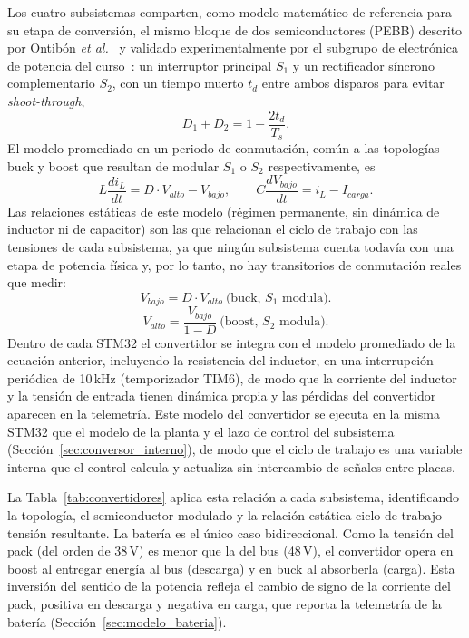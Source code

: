 \documentclass[conference]{IEEEtran}
\begin{document}
Los cuatro subsistemas comparten, como modelo matemático de referencia para su etapa de conversión, el mismo bloque de dos semiconductores (PEBB) descrito por Ontibón \emph{et al.}~\cite{ontibon2025pebb} y validado experimentalmente por el subgrupo de electrónica de potencia del curso~\cite{pinto2026peb}: un interruptor principal $S_1$ y un rectificador síncrono complementario $S_2$, con un tiempo muerto $t_d$ entre ambos disparos para evitar \emph{shoot-through},
\begin{equation}
D_1 + D_2 = 1 - \frac{2t_d}{T_s}.
\end{equation}
El modelo promediado en un periodo de conmutación, común a las topologías buck y boost que resultan de modular $S_1$ o $S_2$ respectivamente, es
\begin{equation}
L\frac{di_L}{dt} = D\cdot V_{alto} - V_{bajo}, \qquad C\frac{dV_{bajo}}{dt} = i_L - I_{carga}.
\end{equation}
Las relaciones estáticas de este modelo (régimen permanente, sin dinámica de inductor ni de capacitor) son las que relacionan el ciclo de trabajo con las tensiones de cada subsistema, ya que ningún subsistema cuenta todavía con una etapa de potencia física y, por lo tanto, no hay transitorios de conmutación reales que medir:
\begin{equation}
V_{bajo} = D\cdot V_{alto} \ \text{(buck, } S_1 \text{ modula)}.
\end{equation}
\begin{equation}
V_{alto} = \frac{V_{bajo}}{1-D} \ \text{(boost, } S_2 \text{ modula)}.
\end{equation}
Dentro de cada STM32 el convertidor se integra con el modelo promediado de la ecuación anterior, incluyendo la resistencia del inductor, en una interrupción periódica de 10\,kHz (temporizador TIM6), de modo que la corriente del inductor y la tensión de entrada tienen dinámica propia y las pérdidas del convertidor aparecen en la telemetría. %
Este modelo del convertidor se ejecuta en la misma STM32 que el modelo de la planta y el lazo de control del subsistema (Sección~\ref{sec:conversor_interno}), de modo que el ciclo de trabajo es una variable interna que el control calcula y actualiza sin intercambio de señales entre placas.

La Tabla~\ref{tab:convertidores} aplica esta relación a cada subsistema, identificando la topología, el semiconductor modulado y la relación estática ciclo de trabajo--tensión resultante. La batería es el único caso bidireccional. Como la tensión del pack (del orden de 38\,V) es menor que la del bus (48\,V), el convertidor opera en boost al entregar energía al bus (descarga) y en buck al absorberla (carga). Esta inversión del sentido de la potencia refleja el cambio de signo de la corriente del pack, positiva en descarga y negativa en carga, que reporta la telemetría de la batería (Sección~\ref{sec:modelo_bateria}).
\end{document}
